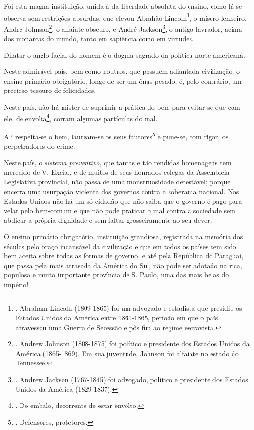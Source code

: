 Foi esta magna instituição, unida à da liberdade absoluta do ensino,
como lá se observa sem restrições absurdas, que elevou Abrahão
Lincoln\footnote{. Abraham Lincoln (1809-1865) foi um advogado e
  estadista que presidiu os Estados Unidos da América entre 1861-1865,
  período em que o país atravessou uma Guerra de Secessão e pôs fim ao
  regime escravista.}, o mísero lenheiro, André Johnson\footnote{.
  Andrew Johnson (1808-1875) foi político e presidente dos Estados
  Unidos da América (1865-1869). Em sua juventude, Johnson foi alfaiate
  no estado do Tennessee.}, o alfaiate obscuro, e André
Jackson\footnote{. Andrew Jackson (1767-1845) foi advogado, político e
  presidente dos Estados Unidos da América (1829-1837).}, o antigo
lavrador, acima dos monarcas do mundo, tanto em sapiência como em
virtudes.

Dilatar o anglo facial do homem é o dogma sagrado da política
norte-americana.

Neste admirável país, bem como noutros, que possuem adiantada
civilização, o ensino primário obrigatório, longe de ser um ônus pesado,
é, pelo contrário, um precioso tesouro de felicidades.

Neste país, não há mister de suprimir a prática do bem para evitar-se
que com ele, de envolta\footnote{. De embalo, decorrente de estar
  envolto.}, corram algumas partículas do mal.

Ali respeita-se o bem, lauream-se os seus fautores\footnote{.
  Defensores, protetores.} e pune-se, com rigor, os perpetradores do
crime.

Neste país, o \emph{sistema preventivo}, que tantas e tão rendidas
homenagens tem merecido de V. Excia., e de muitos de seus honrados
colegas da Assembleia Legislativa provincial, não passa de uma
monstruosidade detestável; porque encerra uma usurpação violenta dos
governos contra a soberania nacional. Nos Estados Unidos não há um só
cidadão que não saiba que o governo é pago para velar pelo bem-comum e
que não pode praticar o mal contra a sociedade sem abdicar a própria
dignidade e sem faltar grosseiramente ao seu dever.

O ensino primário obrigatório, instituição grandiosa, registrada na
memória dos séculos pelo braço incansável da civilização e que em todos
os países tem sido bem aceita sobre todas as formas de governo, e até
pela República do Paraguai, que passa pela mais atrasada da América do
Sul, não pode ser adotado na rica, populosa e muito importante província
de S. Paulo, uma das mais belas do império!

